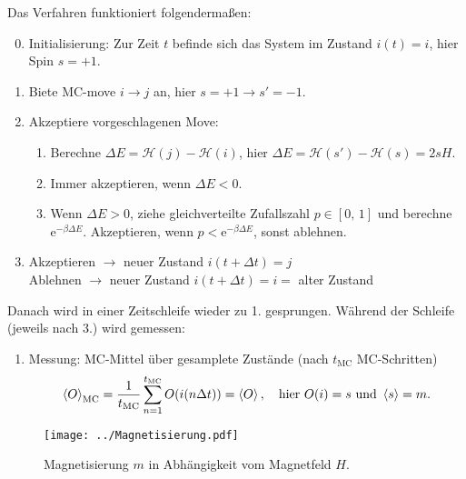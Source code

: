 Das Verfahren funktioniert folgendermaßen:
\begin{enumerate}
\setcounter{enumi}{-1}
\item Initialisierung: Zur Zeit $t$ befinde sich das System im Zustand $i(t)=i$, hier Spin $s=+1$.
\item Biete MC-move $i\rightarrow j$ an, hier $s=+1\rightarrow s'=-1$.
\item Akzeptiere vorgeschlagenen Move:
\begin{enumerate}
\item Berechne $\Delta E=\mathcal{H}(j)-\mathcal{H}(i)$, hier $\Delta E=\mathcal{H}(s')-\mathcal{H}(s)=2sH$.
\item Immer akzeptieren, wenn $\Delta E<0$.
\item Wenn $\Delta E>0$, ziehe gleichverteilte Zufallszahl $p\in[0,\,1]$ und berechne $\mathrm{e}^{-\beta\Delta E}$. Akzeptieren, wenn $p<\mathrm{e}^{-\beta\Delta E}$, sonst ablehnen.
\end{enumerate}
\item Akzeptieren $\rightarrow$ neuer Zustand $i(t+\Delta t)=j$\\Ablehnen $\rightarrow$ neuer Zustand $i(t+\Delta t)=i=$ alter Zustand
\end{enumerate}
Danach wird in einer Zeitschleife wieder zu 1. gesprungen. Während der Schleife (jeweils nach 3.) wird gemessen:
\begin{enumerate}[resume]
\item Messung: MC-Mittel über gesamplete Zustände (nach $t_\text{MC}$ MC-Schritten)
\[\braket{O}_\text{MC}=\frac{1}{t_\text{MC}}\sum_{n=1}^{t_\text{MC}}O(i(n\Delta t))=\braket{O},~~~\text{hier }O(i)=s~\text{und }\braket{s}=m.\]
\end{enumerate}

\begin{figure}[H]
\centering
\texttt{[image: ../Magnetisierung.pdf]}
\caption{Magnetisierung $m$ in Abhängigkeit vom Magnetfeld $H$.}
\label{fig:Magnetisierung}
\end{figure}